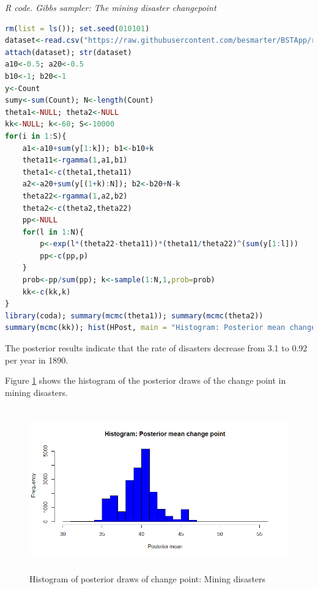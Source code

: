 \begin{tcolorbox}[enhanced,width=4.67in,center upper,
	fontupper=\large\bfseries,drop shadow southwest,sharp corners]
	\textit{R code. Gibbs sampler: The mining disaster changepoint}
	\begin{VF}
		\begin{lstlisting}[language=R]
rm(list = ls()); set.seed(010101)
dataset<-read.csv("https://raw.githubusercontent.com/besmarter/BSTApp/refs/heads/master/DataApp/MiningDataCarlin.csv",header=T)
attach(dataset); str(dataset)
a10<-0.5; a20<-0.5
b10<-1; b20<-1
y<-Count
sumy<-sum(Count); N<-length(Count)
theta1<-NULL; theta2<-NULL
kk<-NULL; k<-60; S<-10000
for(i in 1:S){
	a1<-a10+sum(y[1:k]); b1<-b10+k
	theta11<-rgamma(1,a1,b1)
	theta1<-c(theta1,theta11)
	a2<-a20+sum(y[(1+k):N]); b2<-b20+N-k
	theta22<-rgamma(1,a2,b2)
	theta2<-c(theta2,theta22)
	pp<-NULL
	for(l in 1:N){
		p<-exp(l*(theta22-theta11))*(theta11/theta22)^(sum(y[1:l]))
		pp<-c(pp,p)
	}
	prob<-pp/sum(pp); k<-sample(1:N,1,prob=prob)
	kk<-c(kk,k)
}
library(coda); summary(mcmc(theta1)); summary(mcmc(theta2))
summary(mcmc(kk)); hist(HPost, main = "Histogram: Posterior mean change point", xlab = "Posterior mean", col = "blue", breaks = 25)
\end{lstlisting}
	\end{VF}
\end{tcolorbox} 

The posterior results indicate that the rate of disasters decrease from 3.1 to 0.92 per year in 1890. 

Figure \ref{fig52} shows the histogram of the posterior draws of the change point in mining disasters. 

\begin{figure}[!h]
	\includegraphics[width=340pt, height=200pt]{Chapters/chapter5/figures/Mining.png}
	\caption[List of figure caption goes here]{Histogram of posterior draws of change point: Mining disasters}\label{fig52}
\end{figure} 

